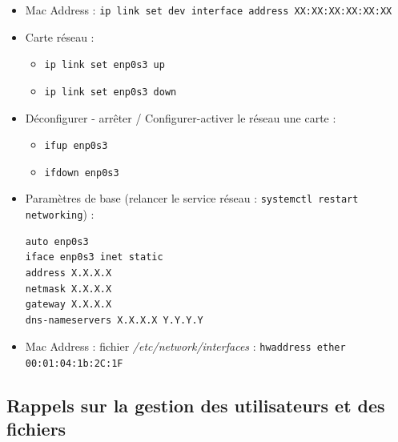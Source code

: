 \documentclass[a4paper]{article}
\begin{document}
\begin{itemize}
\item Mac Address : \texttt{ip link set dev interface address XX:XX:XX:XX:XX:XX}

\item Carte réseau :
\begin{itemize}
    \item \texttt{ip link set enp0s3 up}
    \item \texttt{ip link set enp0s3 down}
\end{itemize}

\item Déconfigurer - arrêter / Configurer-activer le réseau une carte :
\begin{itemize}
    \item \texttt{ifup enp0s3}
    \item \texttt{ifdown enp0s3}
\end{itemize}

\item Paramètres de base (relancer le service réseau : \texttt{systemctl restart networking}) :
\begin{verbatim}
auto enp0s3
iface enp0s3 inet static
address X.X.X.X
netmask X.X.X.X
gateway X.X.X.X
dns-nameservers X.X.X.X Y.Y.Y.Y
\end{verbatim}

\item Mac Address : fichier \textit{/etc/network/interfaces} : \texttt{hwaddress ether 00:01:04:1b:2C:1F}

\end{itemize}










\subsection{Rappels sur la gestion des utilisateurs et des fichiers}
\end{document}
